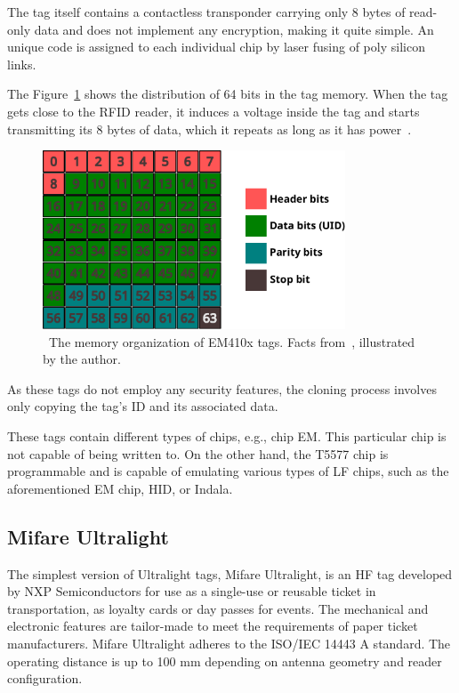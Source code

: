 The tag itself contains a contactless transponder carrying only 8 bytes of read-only data and does not implement any encryption, making it quite simple. An unique code is assigned to each individual chip by laser fusing of poly silicon links.~\cite{krumnikl2015em410x}

The Figure~\ref{fig:em410xdata} shows the distribution of 64 bits in the tag memory. When the tag gets close to the RFID reader, it induces a voltage inside the tag and starts transmitting its 8 bytes of data, which it repeats as long as it has power~\cite{priority1designEM4100Protocol}.


\begin{figure}[h]
  \centering
  \includegraphics[width=9cm]{text/theoretical_background/em410x_data.pdf} %
  \caption[The memory organization of EM410x tags.]{~The memory organization of EM410x tags. Facts from~\cite{krumnikl2015em410x}, illustrated by the author.}
  \label{fig:em410xdata}
\end{figure}

As these tags do not employ any security features, the cloning process involves only copying the tag's ID and its associated data.~\cite{koscher2009EPC}

These tags contain different types of chips, e.g., chip EM. This particular chip is not capable of being written to. On the other hand, the T5577 chip is programmable and is capable of emulating various types of LF chips, such as the aforementioned EM chip, HID, or Indala.~\cite{lfchipsforum}


\subsection{Mifare Ultralight}

The simplest version of Ultralight tags, Mifare Ultralight, is an HF tag developed by NXP Semiconductors for use as a single-use or reusable ticket in transportation, as loyalty cards or day passes for events. The mechanical and electronic features are tailor-made to meet the requirements of paper ticket manufacturers. Mifare Ultralight adheres to the ISO/IEC 14443 A standard. The operating distance is up to 100 mm depending on antenna geometry and reader configuration.~\cite{ultralightdatasheet}

